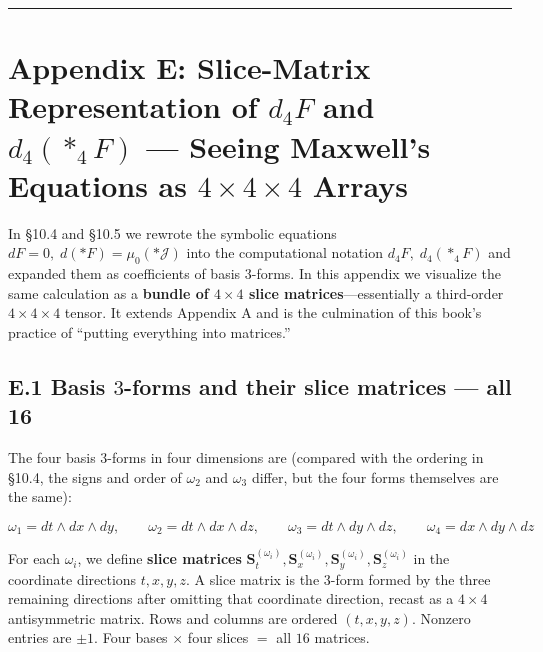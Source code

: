 \begin{center}\rule{0.5\linewidth}{0.5pt}\end{center}

\hypertarget{appendix-e-slice-matrix-representation-of-d_4f-and-d_4ast_4f-seeing-maxwells-equations-as-4times4times4-arrays}{%
\section{\texorpdfstring{Appendix E: Slice-Matrix Representation of
\(d_4F\) and \(d_4(\ast_4F)\) --- Seeing Maxwell's Equations as
\(4\times4\times4\)
Arrays}{Appendix E: Slice-Matrix Representation of d\_4F and d\_4(\textbackslash ast\_4F) --- Seeing Maxwell's Equations as 4\textbackslash times4\textbackslash times4 Arrays}}\label{appendix-e-slice-matrix-representation-of-d_4f-and-d_4ast_4f-seeing-maxwells-equations-as-4times4times4-arrays}}

In §10.4 and §10.5 we rewrote the symbolic equations
\(dF=0,\;d(\ast F)=\mu_0(\ast\mathcal J)\) into the computational
notation \(d_4F,\;d_4(\ast_4F)\) and expanded them as coefficients of
basis \(3\)-forms. In this appendix we visualize the same calculation as
a \textbf{bundle of $4\times4$ slice matrices}---essentially a
third-order \(4\times4\times4\) tensor. It extends Appendix A and is the
culmination of this book's practice of ``putting everything into
matrices.''

\hypertarget{e.1-basis-3-forms-and-their-slice-matrices-all-16}{%
\subsection{\texorpdfstring{E.1 Basis \(3\)-forms and their slice
matrices --- all
16}{E.1 Basis 3-forms and their slice matrices --- all 16}}\label{e.1-basis-3-forms-and-their-slice-matrices-all-16}}

The four basis \(3\)-forms in four dimensions are (compared with the
ordering in §10.4, the signs and order of \(\omega_2\) and \(\omega_3\)
differ, but the four forms themselves are the same):

\[
\omega_1 = dt\wedge dx\wedge dy,\qquad
\omega_2 = dt\wedge dx\wedge dz,\qquad
\omega_3 = dt\wedge dy\wedge dz,\qquad
\omega_4 = dx\wedge dy\wedge dz
\]

For each \(\omega_i\), we define \textbf{slice matrices}
\(\mathbf{S}_{t}^{(\omega_i)}, \mathbf{S}_{x}^{(\omega_i)}, \mathbf{S}_{y}^{(\omega_i)}, \mathbf{S}_{z}^{(\omega_i)}\)
in the coordinate directions \(t,x,y,z\). A slice matrix is the
\(3\)-form formed by the three remaining directions after omitting that
coordinate direction, recast as a \(4\times4\) antisymmetric matrix.
Rows and columns are ordered \((t,x,y,z)\). Nonzero entries are
\(\pm1\). Four bases \(\times\) four slices \(=\) all \(16\) matrices.

